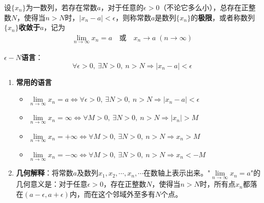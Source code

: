 \documentclass[../book.tex]{subfiles}
\begin{document}
    设$\{x_n\}$为一数列，若存在常数$a$，对于任意的$\epsilon > 0$（不论它多么小），总存在正整数$N$，使得当$n > N$时，$|x_n - a| < \epsilon$，则称常数$a$是数列$\{x_n\}$的\textbf{极限}，或者称数列$\{x_n\}$\textbf{收敛于}$a$，记为
    \begin{gather*}
        \lim_{n \to \infty} x_n = a \quad \text{或} \quad x_n \to a \;(n \to \infty)
    \end{gather*}

    \textbf{$\epsilon-N$语言}：
    \[
        \forall \epsilon > 0,\ \exists N > 0,\ n > N \Rightarrow |x_n - a| < \epsilon
    \]

    \begin{enumerate}
        \item \textbf{常用的语言}
        \begin{itemize}
            \item $\lim\limits_{n\to \infty} x_n = a \Leftrightarrow \forall \epsilon > 0,\ \exists N > 0,\ n > N \Rightarrow |x_n - a| < \epsilon$
            \item $\lim\limits_{n\to \infty} x_n = \infty \Leftrightarrow \forall M > 0,\ \exists N > 0,\ n > N \Rightarrow |x_n| > M$
            \item $\lim\limits_{n\to \infty} x_n = +\infty \Leftrightarrow \forall M > 0,\ \exists N > 0,\ n > N \Rightarrow x_n > M$
            \item $\lim\limits_{n\to \infty} x_n = -\infty \Leftrightarrow \forall M > 0,\ \exists N > 0,\ n > N \Rightarrow x_n < -M$
        \end{itemize}
        \item \textbf{几何解释}：将常数$a$及数列$x_1, x_2, \cdots, x_n, \cdots$在数轴上表示出来。"$\lim\limits_{n\to\infty}x_n = a$"的几何意义是：对于任意$\epsilon > 0$，存在正整数$N$，使得当$n > N$时，所有点$x_n$都落在$(a-\epsilon, a+\epsilon)$内，而在这个邻域外至多有$N$个点。
    \end{enumerate}
\end{document}
